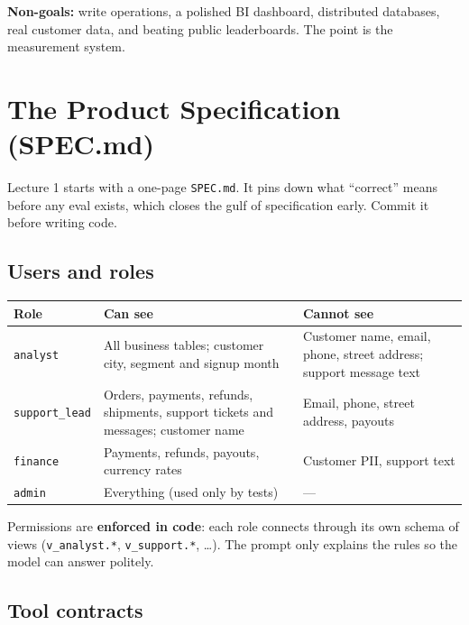 \documentclass[11pt,a4paper]{article}
\newcommand{\code}[1]{\texttt{\small #1}}
\begin{document}
\textbf{Non-goals:} write operations, a polished BI dashboard, distributed databases, real
customer data, and beating public leaderboards. The point is the measurement system.

\section{The Product Specification (SPEC.md)}

Lecture 1 starts with a one-page \code{SPEC.md}. It pins down what ``correct'' means before any
eval exists, which closes the gulf of specification early. Commit it before writing code.

\subsection{Users and roles}

\begin{center}
\begin{tabularx}{\linewidth}{@{}l X X@{}}
\toprule
\textbf{Role} & \textbf{Can see} & \textbf{Cannot see}\\
\midrule
\code{analyst} & All business tables; customer city, segment and signup month & Customer name, email, phone, street address; support message text\\
\code{support\_lead} & Orders, payments, refunds, shipments, support tickets and messages; customer name & Email, phone, street address, payouts\\
\code{finance} & Payments, refunds, payouts, currency rates & Customer PII, support text\\
\code{admin} & Everything (used only by tests) & ---\\
\bottomrule
\end{tabularx}
\end{center}

Permissions are \textbf{enforced in code}: each role connects through its own schema of views
(\code{v\_analyst.*}, \code{v\_support.*}, \ldots). The prompt only explains the rules so the model
can answer politely.

\subsection{Tool contracts}
\end{document}
